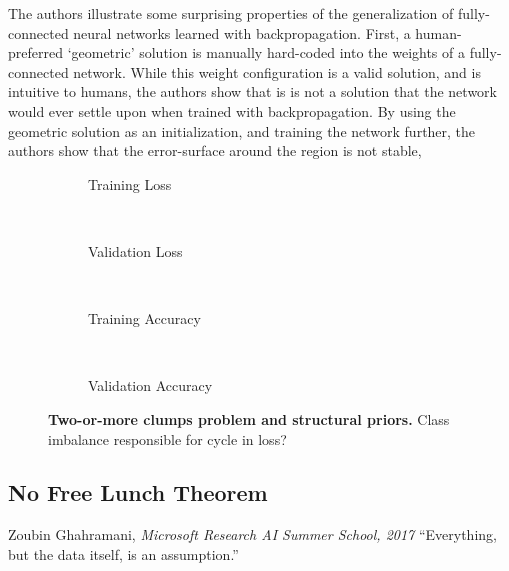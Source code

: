\documentclass[thesis]{subfiles}
\begin{document}
	The authors illustrate some surprising properties of the generalization of fully-connected neural networks learned with backpropagation. First, a human-preferred `geometric' solution is manually hard-coded into the weights of a fully-connected network. While this weight configuration is a valid solution, and is intuitive to humans, the authors show that is is not a solution that the network would ever settle upon when trained with backpropagation. By using the geometric solution as an initialization, and training the network further, the authors show that the error-surface around the region is not stable,
	
	\begin{figure}[tb]
		\centering
		\begin{subfigure}[t]{0.49\textwidth}
			\resizebox{\linewidth}{!}{}
			\caption{Training Loss}
			\label{fig:tomplotmintrainloss}
		\end{subfigure}
		~
		\begin{subfigure}[t]{0.49\textwidth}
			\resizebox{\linewidth}{!}{}
			\caption{Validation Loss}
			\label{fig:tomplotminvalloss}
		\end{subfigure}\\
		\begin{subfigure}[t]{0.49\textwidth}
			\resizebox{\linewidth}{!}{}
			\caption{Training Accuracy}
			\label{fig:tomplotmaxtrainacc}
		\end{subfigure}
		~
		\begin{subfigure}[t]{0.49\textwidth}
			\resizebox{\linewidth}{!}{}
			\caption{Validation Accuracy}
			\label{fig:tomplotmaxvalacc}
		\end{subfigure}
		\caption[Two-or-more clumps problem and structural priors.]{\textbf{Two-or-more clumps problem and structural priors.} Class imbalance responsible for cycle in loss?}
		\label{fig:tomplot}
	\end{figure}

\subsection{No Free Lunch Theorem}
\label{nofreelunch}
\begin{chapquote}{Zoubin Ghahramani, \textit{Microsoft Research AI Summer School, 2017}}
	``Everything, but the data itself, is an assumption.''
\end{chapquote}
\end{document}
